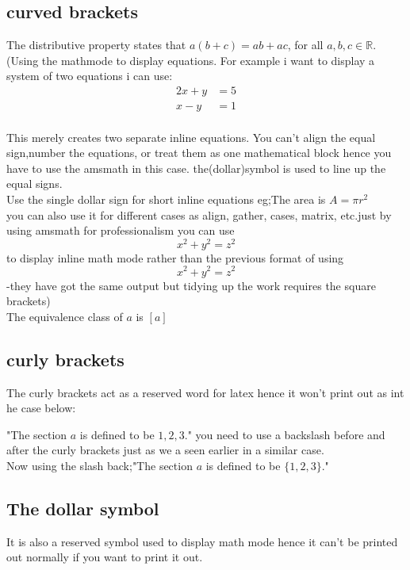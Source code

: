 \documentclass[a4paper,12pt]{article}
\begin{document}
  \subsection{curved brackets}
  The distributive property states that $a(b+c)=ab+ac$, for all $a, b, c \in \mathbb{R}$.\\
  (Using the mathmode to display equations. For example i want to display a system of two equations i can use:\\
  \begin{align*}
  	2x + y &= 5\\
  	x -y &= 1
  	\end{align*}\\
  	
  	This merely creates two separate inline equations. You can't align the equal sign,number the equations, or treat them as one mathematical block hence you have to use the amsmath in this case.
  	the(dollar)symbol is used to line up the equal signs.\\[0.2pt]
  	
  		Use the single dollar sign for short inline equations eg;The area is $A=\pi r^2$\\[1pt] 		
  		you can also use it for different cases as align, gather, cases, matrix, etc.just by using amsmath
  		for professionalism you can use \[x^2 + y^2 = z^2\] to display inline math mode rather than the previous format of using $$x^2 + y^2 = z^2$$-they have got the same output but tidying up the work requires the square brackets)\\[6pt]
  		The equivalence class of $a$ is $[a]$
  		
  		\subsection{curly brackets}
  		
  		
  		The curly brackets act as a reserved word for latex hence it won't print out as int he case below:
  		
  		"The section $a$ is defined to be ${1, 2, 3}$."
  		you need to use a backslash before and after the curly brackets just as we a seen earlier in a similar case.\\
  		
  		Now using the slash back;"The section $a$ is defined to be $\{1, 2, 3\}$."
  		
  		\subsection{The dollar symbol}
  		It is also a reserved symbol used to display math mode hence it can't be printed out normally if you want to print it out.
  		
\end{document}
